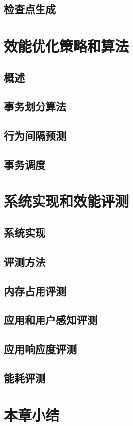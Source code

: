 \subsection{检查点生成}

\section{效能优化策略和算法}

\subsection{概述}

\subsection{事务划分算法}

\subsection{行为间隔预测}

\subsection{事务调度}

\section{系统实现和效能评测}

\subsection{系统实现}

\subsection{评测方法}

\subsection{内存占用评测}

\subsection{应用和用户感知评测}

\subsection{应用响应度评测}

\subsection{能耗评测}

\section{本章小结}


